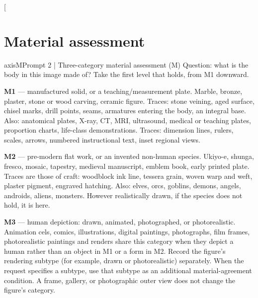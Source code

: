 \clearpage
\twocolumn[{\begin{minipage}{\textwidth}
\section{Material assessment}
\label{app:axisprompts}
\begin{promptcard}{axisM}{Prompt 2 | Three-category material assessment (M)}
Question: what is the body in this image made of? Take the first level that
holds, from M1 downward.

\textbf{M1} --- manufactured solid, or a teaching/measurement plate. Marble, bronze,
plaster, stone or wood carving, ceramic figure. Traces: stone veining, aged
surface, chisel marks, drill points, seams, armatures entering the body, an
integral base. Also: anatomical plates, X-ray, CT, MRI, ultrasound, medical or
teaching plates, proportion charts, life-class demonstrations. Traces:
dimension lines, rulers, scales, arrows, numbered instructional text, inset
regional views.

\textbf{M2} --- pre-modern flat work, or an invented non-human species. Ukiyo-e,
shunga, fresco, mosaic, tapestry, medieval manuscript, emblem book, early
printed plate. Traces are those of craft: woodblock ink line, tessera grain,
woven warp and weft, plaster pigment, engraved hatching. Also: elves, orcs,
goblins, demons, angels, androids, aliens, monsters. However realistically
drawn, if the species does not hold, it is here.

\textbf{M3} --- human depiction: drawn, animated, photographed, or
photorealistic. Animation cels, comics, illustrations, digital paintings,
photographs, film frames, photorealistic paintings and renders share this
category when they depict a human rather than an object in M1 or a form in M2.
Record the figure's rendering subtype (for example, drawn or photorealistic)
separately. When the request specifies a subtype, use that subtype as an
additional material-agreement condition. A frame, gallery, or photographic
outer view does not change the figure's category.


\end{promptcard}
\end{minipage}}

